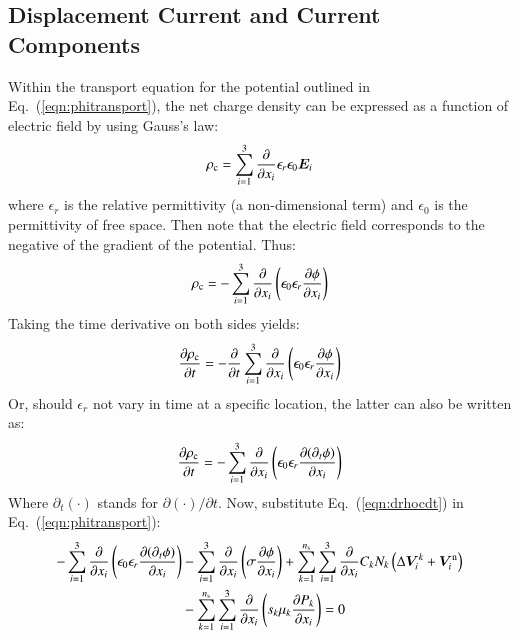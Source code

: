 \documentclass{warpdoc}
\newcommand{\alb}{\vspace{0.2cm}\\} %
\newcommand{\ns}{{n_{\rm s}}}
\renewcommand{\vec}[1]{\bm{#1}}
\begin{document}
\subsection{Displacement Current and Current Components}

Within the transport equation for the potential outlined in Eq.\ (\ref{eqn:phitransport}), the net charge density can be expressed as a function of electric field by using Gauss's law:
%
\begin{equation}
  \rho_{\rm c} =  \sum_{i=1}^3 \frac{\partial }{\partial x_i} \epsilon_r \epsilon_0 \vec{E}_i
\end{equation}
%
where $\epsilon_r$ is the relative permittivity (a non-dimensional term) and $\epsilon_0$ is the permittivity of free space. Then note that the electric field corresponds to the negative of the gradient of the potential. Thus:
%
\begin{equation}
  \rho_{\rm c} = - \sum_{i=1}^3 \frac{\partial }{\partial x_i}\left(\epsilon_0 \epsilon_r \frac{\partial \phi}{\partial x_i} \right)
\end{equation}
%
Taking the time derivative on both sides yields:
%
\begin{equation}
  \frac{\partial \rho_{\rm c}}{\partial t} = - \frac{\partial }{\partial t}\sum_{i=1}^3 \frac{\partial }{\partial x_i}\left(\epsilon_0 \epsilon_r \frac{\partial \phi}{\partial x_i} \right)
\end{equation}
%
Or, should $\epsilon_r$ not vary in time at a specific location, the latter can also be written as:
%
\begin{equation}
  \frac{\partial \rho_{\rm c}}{\partial t} = - \sum_{i=1}^3 \frac{\partial }{\partial x_i}\left(\epsilon_0 \epsilon_r \frac{\partial (\partial_t \phi)}{\partial x_i} \right)
\label{eqn:drhocdt}
\end{equation}
%
Where $\partial_t(\cdot)$ stands for $\partial (\cdot)/\partial t$.  Now, substitute Eq.\ (\ref{eqn:drhocdt}) in Eq.\ (\ref{eqn:phitransport}):
%
\begin{align}
- \sum_{i=1}^3 \frac{\partial }{\partial x_i}\left(\epsilon_0 \epsilon_r \frac{\partial (\partial_t \phi)}{\partial x_i} \right)
&- \sum_{i=1}^3 \frac{\partial}{\partial x_i}\left( \sigma  \frac{\partial \phi}{\partial x_i}   \right)
+ \sum_{k=1}^\ns\sum_{i=1}^3 \frac{\partial}{\partial x_i} C_k N_k \left(\Delta \vec{V}^k_i+\vec{V}^{\rm n}_i \right) \nonumber\alb
&- \sum_{k=1}^\ns\sum_{i=1}^3 \frac{\partial}{\partial x_i}  \left({s_k \mu_k} \frac{\partial P_k}{\partial x_i} \right) 
= 0
\end{align}
\end{document}
